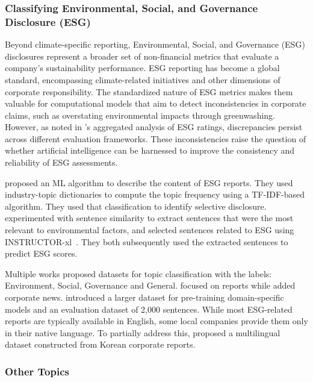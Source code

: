 \subsubsection{Classifying Environmental, Social, and Governance Disclosure (ESG)}

Beyond climate-specific reporting, Environmental, Social, and Governance (ESG) disclosures represent a broader set of non-financial metrics that evaluate a company's sustainability performance. ESG reporting has become a global standard, encompassing climate-related initiatives and other dimensions of corporate responsibility. The standardized nature of ESG metrics makes them valuable for computational models that aim to detect inconsistencies in corporate claims, such as overstating environmental impacts through greenwashing. However, as noted in \citet{berg2022aggregate}'s aggregated analysis of ESG ratings, discrepancies persist across different evaluation frameworks. These inconsistencies raise the question of whether artificial intelligence can be harnessed to improve the consistency and reliability of ESG assessments.

\zeroshot \citet{rouenEvolutionESGReports2023} proposed an ML algorithm to describe the content of ESG reports. They used industry-topic dictionaries to compute the topic frequency using a TF-IDF-based algorithm. They used that classification to identify selective disclosure. \citet{Mehra_2022} experimented with sentence similarity to extract sentences that were the most relevant to environmental factors, and \cite{bronzini_glitter_2023} selected sentences related to ESG using INSTRUCTOR-xl~\cite{su2023embeddertaskinstructionfinetunedtext}. They both subsequently used the extracted sentences to predict ESG scores.

\datasets Multiple works \cite{huangFinBERTLargeLanguage2020, schimanski_bridging_2023, LEE2023119726} proposed datasets for topic classification with the labels: Environment, Social, Governance and General.
\citet{huangFinBERTLargeLanguage2020} focused on reports while \citet{schimanski_bridging_2023} added corporate news. \citet{schimanski_bridging_2023} introduced a larger dataset for pre-training domain-specific models and an evaluation dataset of 2,000 sentences. While most ESG-related reports are typically available in English, some local companies provide them only in their native language. To partially address this, \citet{LEE2023119726} proposed a multilingual dataset constructed from Korean corporate reports.

\subsubsection{Other Topics}
\label{sec:other-sub-topics}


